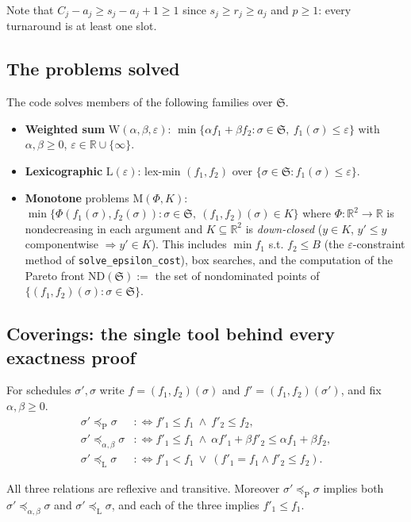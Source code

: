 \documentclass[11pt,a4paper]{article}
\newcommand{\Sched}{\mathfrak{S}}
\newcommand{\R}{\mathbb{R}}
\newcommand{\code}[1]{\texttt{#1}}
\newcommand{\preceqP}{\preceq_{\mathrm{P}}}
\newcommand{\preceqW}{\preceq_{\alpha,\beta}}
\newcommand{\preceqL}{\preceq_{\mathrm{L}}}
\begin{document}
Note that $C_j-a_j\ge s_j - a_j + 1\ge 1$ since $s_j\ge r_j\ge a_j$ and
$p\ge1$: every turnaround is at least one slot.

\subsection{The problems solved}

The code solves members of the following families over $\Sched$.
\begin{itemize}[nosep]
  \item \textbf{Weighted sum} $\mathrm{W}(\alpha,\beta,\varepsilon)$:
    $\min\{\alpha f_1+\beta f_2 : \sigma\in\Sched,\ f_1(\sigma)\le\varepsilon\}$
    with $\alpha,\beta\ge0$, $\varepsilon\in\R\cup\{\infty\}$.
  \item \textbf{Lexicographic} $\mathrm{L}(\varepsilon)$: lex-min
    $(f_1,f_2)$ over $\{\sigma\in\Sched: f_1(\sigma)\le\varepsilon\}$.
  \item \textbf{Monotone} problems $\mathrm{M}(\Phi,K)$:
    $\min\{\Phi(f_1(\sigma),f_2(\sigma)) : \sigma\in\Sched,\ (f_1,f_2)(\sigma)\in K\}$
    where $\Phi:\R^2\to\R$ is nondecreasing in each argument and
    $K\subseteq\R^2$ is \emph{down-closed} ($y\in K$, $y'\le y$
    componentwise $\Rightarrow y'\in K$). This includes $\min f_1$ s.t.
    $f_2\le B$ (the $\varepsilon$-constraint method of
    \code{solve\_epsilon\_cost}), box searches, and the computation of the
    Pareto front $\mathrm{ND}(\Sched):=$ the set of nondominated points of
    $\{(f_1,f_2)(\sigma):\sigma\in\Sched\}$.
\end{itemize}

\subsection{Coverings: the single tool behind every exactness proof}

\begin{definition}[Preorders]\label{def:preorders}
For schedules $\sigma',\sigma$ write $f=(f_1,f_2)(\sigma)$ and
$f'=(f_1,f_2)(\sigma')$, and fix $\alpha,\beta\ge0$.
\begin{align*}
\sigma'\preceqP\sigma &:\iff f'_1\le f_1\ \wedge\ f'_2\le f_2,\\
\sigma'\preceqW\sigma &:\iff f'_1\le f_1\ \wedge\ \alpha f'_1+\beta f'_2\le \alpha f_1+\beta f_2,\\
\sigma'\preceqL\sigma &:\iff f'_1< f_1\ \vee\ (f'_1=f_1\wedge f'_2\le f_2).
\end{align*}
\end{definition}
All three relations are reflexive and transitive. Moreover
$\sigma'\preceqP\sigma$ implies both $\sigma'\preceqW\sigma$ and
$\sigma'\preceqL\sigma$, and each of the three implies $f'_1\le f_1$.
\end{document}
